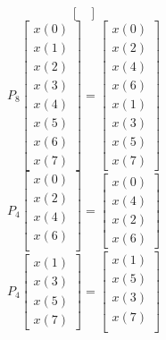 \documentclass[journal,12pt,twocolumn]{IEEEtran}
\renewcommand\thesection{\arabic{section}}
\begin{document}
\begin{enumerate}[label=\thesection.\arabic*
	,ref=\thesection.\theenumi]
\begin{enumerate}[label=\arabic*.,ref=\thesection.\theenumi]
\begin{equation}
\begin{bmatrix}
		\end{bmatrix}
	\end{equation}
	\begin{equation}
		P_{8}
		\begin{bmatrix}
			x(0) \\ 
			x(1) \\ 
			x(2) \\ 
			x(3) \\ 
			x(4) \\ 
			x(5) \\
			x(6) \\
			x(7)
		\end{bmatrix}
		= 
		\begin{bmatrix}
			x(0) \\ 
			x(2) \\ 
			x(4) \\ 
			x(6) \\
			x(1) \\ 
			x(3) \\ 
			x(5) \\
			x(7)
		\end{bmatrix}
	\end{equation}
	\begin{equation}
		P_{4}
		\begin{bmatrix}
			x(0) \\ 
			x(2) \\ 
			x(4) \\ 
			x(6) \\
		\end{bmatrix}
		= 
		\begin{bmatrix}
			x(0) \\ 
			x(4) \\ 
			x(2) \\
			x(6)
		\end{bmatrix}
	\end{equation}
	\begin{equation}
		P_{4}
		\begin{bmatrix}
			x(1) \\ 
			x(3) \\ 
			x(5) \\
			x(7)
		\end{bmatrix}
		= 
		\begin{bmatrix}
			x(1) \\ 
			x(5) \\ 
			x(3) \\ 
			x(7) \\
		\end{bmatrix}

\end{equation}
\end{enumerate}
\end{enumerate}
\end{document}
